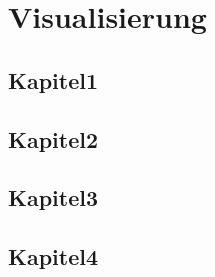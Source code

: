 \chapter{Visualisierung}
\section{Kapitel1}
\section{Kapitel2}
\section{Kapitel3}
\section{Kapitel4}
